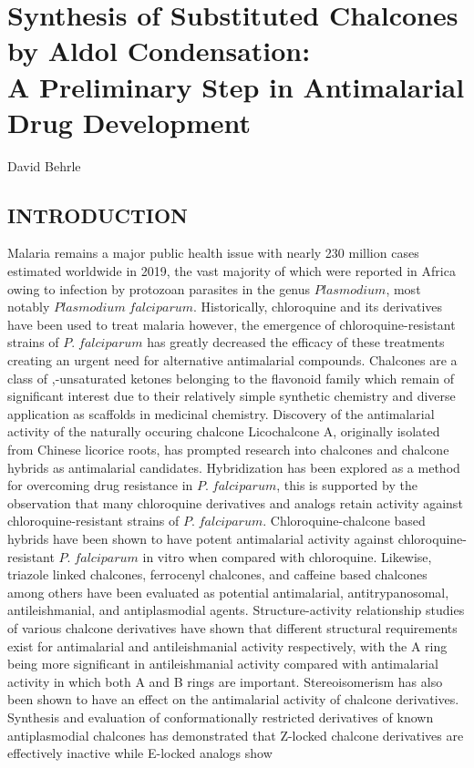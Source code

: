 \documentclass[11pt]{article}
\begin{document}
\linespread{1.25}
\raggedright
\setlength{\parskip}{2pt}
\setlength{\belowcaptionskip}{-8pt}
\def\citenumfont{\textnormal}
\renewcommand{\bibsection}{}

\section*{Synthesis of Substituted Chalcones by Aldol Condensation: \\ A Preliminary Step in Antimalarial Drug Development}

David Behrle

\subsection*{INTRODUCTION}
Malaria remains a major public health issue with nearly 230 million cases estimated worldwide in 2019, the vast majority of which were reported in Africa owing to infection by protozoan parasites in the genus $Plasmodium$, most notably $Plasmodium\; falciparum$.\cite{Fikadu2023} Historically, chloroquine and its derivatives have been used to treat malaria however, the emergence of chloroquine-resistant strains of $P.\; falciparum$ has greatly decreased the efficacy of these treatments creating an urgent need for alternative antimalarial compounds.\cite{Fikadu2023,Yadav2012} Chalcones are a class of \textalpha,\textbeta-unsaturated ketones belonging to the flavonoid family which remain of significant interest due to their relatively simple synthetic chemistry and diverse application as scaffolds in medicinal chemistry.\cite{Qin2020} Discovery of the antimalarial activity of the naturally occuring chalcone Licochalcone A, originally isolated from Chinese licorice roots, has prompted research into chalcones and chalcone hybrids as antimalarial candidates.\cite{Cheng2020,Chen1994} Hybridization has been explored as a method for overcoming drug resistance in $P.\; falciparum$, this is supported by the observation that many chloroquine derivatives and analogs retain activity against chloroquine-resistant strains of $P.\; falciparum$.\cite{Cheng2020,Sashidhara2012} Chloroquine-chalcone based hybrids have been shown to have potent antimalarial activity against chloroquine-resistant $P.\; falciparum$ in vitro when compared with chloroquine.\cite{Sashidhara2012} Likewise, triazole linked chalcones, ferrocenyl chalcones, and caffeine based chalcones among others have been evaluated as potential antimalarial, antitrypanosomal, antileishmanial, and antiplasmodial agents.\cite{Qin2020,Singh2017,Insuasty2015} Structure-activity relationship studies of various chalcone derivatives have shown that different structural requirements exist for antimalarial and antileishmanial activity respectively, with the A ring being more significant in antileishmanial activity compared with antimalarial activity in which both A and B rings are important.\cite{Liu2003} Stereoisomerism has also been shown to have an effect on the antimalarial activity of chalcone derivatives. Synthesis and evaluation of conformationally restricted derivatives of known antiplasmodial chalcones has demonstrated that Z-locked chalcone derivatives are effectively inactive while E-locked analogs show 
\end{document}
